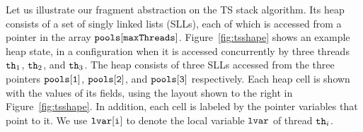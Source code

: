 
Let us illustrate our fragment abstraction on the TS stack algorithm.
Its heap consists of a set of singly linked lists (SLLs), each of which
is accessed from a pointer in the array ${\tt pools[maxThreads]}$.
Figure~\ref{fig:tsshape} shows an example heap state,
in a configuration when %
it is accessed concurrently by three threads ${\tt th}_1$, ${\tt th}_2$, and ${\tt th}_3$. The heap consists of three SLLs accessed from the three pointers $\tt pools[1]$, $\tt pools[2]$, and $\tt pools[3]$ respectively. Each heap cell is
shown with the values of its fields, using the layout shown to the right in
Figure~\ref{fig:tsshape}.
In addition, each cell is labeled by the
pointer variables that point to it. We use ${\tt lvar[i]}$ to denote the local
variable ${\tt lvar}$ of thread ${\tt th}_i$.

